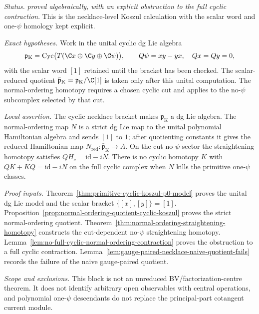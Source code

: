 \begin{stmt}\label{thm:lane-cyclic-koszul-normal-ordering}
  \emph{Status.} \emph{proved algebraically, with an explicit
  obstruction to the full cyclic contraction}.  This is the
  necklace-level Koszul calculation with the scalar word and
  one-\(\psi\) homology kept explicit.

  \emph{Exact hypotheses.} Work in the unital cyclic dg Lie algebra
  \[
    \mathfrak p_{\mathrm K}
    =
    \operatorname{Cyc}\bigl(T(\C x\oplus\C y\oplus\C\psi)\bigr),
    \qquad
    Q\psi=xy-yx,\quad Qx=Qy=0,
  \]
  with the scalar word \([1]\) retained until the bracket has been
  checked.  The scalar-reduced quotient
  \(\bar{\mathfrak p}_{\mathrm K}=\mathfrak p_{\mathrm K}/\C[1]\) is
  taken only after this unital computation.  The normal-ordering
  homotopy requires a chosen cyclic cut and applies to the no-\(\psi\)
  subcomplex selected by that cut.

  \emph{Local assertion.} The cyclic necklace bracket makes
  \(\mathfrak p_{\mathrm K}\) a dg Lie algebra.  The normal-ordering map
  \(N\) is a strict dg Lie map to the unital polynomial Hamiltonian
  algebra and sends \([1]\) to \(1\); after quotienting constants it
  gives the reduced Hamiltonian map
  \(N_{\mathrm{red}}\colon\bar{\mathfrak p}_{\mathrm K}\to\bar A\).
  On the cut no-\(\psi\) sector the straightening homotopy satisfies
  \(QH_c=\mathrm{id}-iN\).  There is no cyclic homotopy
  \(K\) with \(QK+KQ=\mathrm{id}-iN\) on the full cyclic complex when
  \(N\) kills the primitive one-\(\psi\) classes.

  \emph{Proof inputs.}
  Theorem~\ref{thm:primitive-cyclic-koszul-p0-model} proves the unital
  dg Lie model and the scalar bracket \(\{[x],[y]\}=[1]\).
  Proposition~\ref{prop:normal-ordering-quotient-cyclic-koszul}
  proves the strict normal-ordering quotient.
  Theorem~\ref{thm:normal-ordering-straightening-homotopy} constructs
  the cut-dependent no-\(\psi\) straightening homotopy.
  Lemma~\ref{lem:no-full-cyclic-normal-ordering-contraction} proves the
  obstruction to a full cyclic contraction.  Lemma~\ref{lem:gauge-paired-necklace-naive-quotient-fails}
  records the failure of the naive gauge-paired quotient.

  \emph{Scope and exclusions.} This block is not an unreduced
  BV/factorization-centre theorem.  It does not identify arbitrary
  open observables with central operations, and polynomial
  one-\(\psi\) descendants do not replace the principal-part cotangent
  current module.
\end{stmt}

